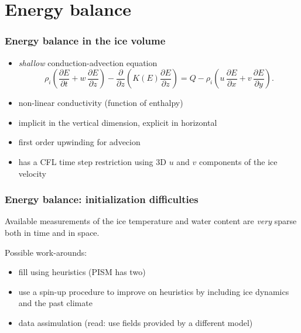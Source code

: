 \documentclass[hide notes,intlimits]{beamer}
\newcommand{\diff}[2]{\frac{\partial #1}{\partial #2}}
\begin{document}
\section{Energy balance}
\label{sec:energy-balance}

\begin{frame}
  \frametitle{Energy balance in the ice volume}
  \begin{itemize}
  \item \emph{shallow} conduction-advection equation
    \begin{equation}
      \label{eq:1}
      \rho_{i} \left( \diff{E}{t} + w\,\diff{E}{z} \right) - \diff{}{z}\left( K(E) \diff{E}{z} \right) = Q - \rho_{i} \left( u\,\diff{E}{x} + v\,\diff{E}{y} \right).
    \end{equation}
  \item non-linear conductivity (function of enthalpy)
  \item implicit in the vertical dimension, explicit in horizontal
  \item first order upwinding for advecion
  \item has a CFL time step restriction using 3D $u$ and $v$
    components of the ice velocity
  \end{itemize}
\end{frame}

\begin{frame}
  \frametitle{Energy balance: initialization difficulties}

  Available measurements of the ice temperature and water content are
  \emph{very} sparse both in time and in space.

  Possible work-arounds:
  \begin{itemize}
  \item fill using heuristics (PISM has two)
  \item use a spin-up procedure to improve on heuristics by including
    ice dynamics and the past climate
  \item data assimulation (read: use fields provided by a different
    model)
  \end{itemize}
\end{frame}

\end{document}

